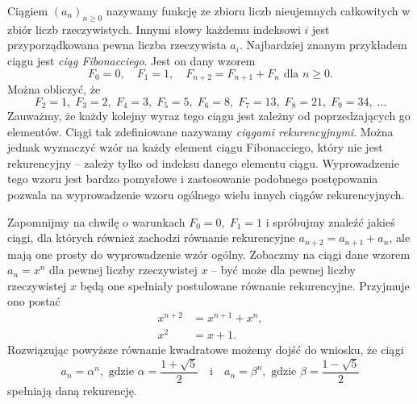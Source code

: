 

\noindent
Ciągiem $(a_n)_{n \geqslant 0}$ nazywamy funkcję ze zbioru liczb nieujemnych całkowitych w zbiór liczb rzeczywistych. Innymi słowy każdemu indeksowi $i$ jest przyporządkowana pewna liczba rzeczywista $a_i$. Najbardziej znanym przykładem ciągu jest \textit{ciąg Fibonacciego}. Jest on dany wzorem
\[
	F_0 = 0, \quad F_1 = 1, \quad F_{n + 2} = F_{n + 1} + F_{n} \text{ dla } n \geqslant 0.
\]
Można obliczyć, że
\[
	F_2 = 1, \; F_3 = 2, \; F_4 = 3, \; F_5 = 5, \; F_6 = 8, \; F_7 = 13, \; F_8 = 21, \; F_9 = 34, \; ...
\]
Zauważmy, że każdy kolejny wyraz tego ciągu jest zależny od poprzedzających go elementów. Ciągi tak zdefiniowane nazywamy \textit{ciągami rekurencyjnymi}. Można jednak wyznaczyć wzór na każdy element ciągu Fibonacciego, który nie jest rekurencyjny -- zależy tylko od indeksu danego elementu ciągu. Wyprowadzenie tego wzoru jest bardzo pomysłowe i zastosowanie podobnego postępowania pozwala na wyprowadzenie wzoru ogólnego wielu innych ciągów rekurencyjnych.

\vspace{10px}


\noindent
Zapomnijmy na chwilę o warunkach $F_0 = 0, \; F_1 = 1$ i spróbujmy znaleźć jakieś ciągi, dla których również zachodzi równanie rekurencyjne $a_{n + 2} = a_{n + 1} + a_n$, ale mają one prosty do wyprowadzenie wzór ogólny. Zobaczmy na ciągi dane wzorem $a_n = x^n$ dla pewnej liczby rzeczywistej $x$ -- być może dla pewnej liczby rzeczywistej $x$ będą one spełniały postulowane równanie rekurencyjne. Przyjmuje ono postać
\begin{align*}
	x^{n + 2} &= x^{n + 1} + x^n, \\
	x^2 &= x + 1.
\end{align*}
Rozwiązując powyższe równanie kwadratowe możemy dojść do wniosku, że ciągi 
\[
	a_n = \alpha^n, \text{ gdzie } \alpha = \frac{1 + \sqrt{5}}{2} \quad \text{i} \quad a_n = \beta^n,  \text{ gdzie } \beta = \frac{1 - \sqrt{5}}{2} 
\] 
spełniają daną rekurencję.

